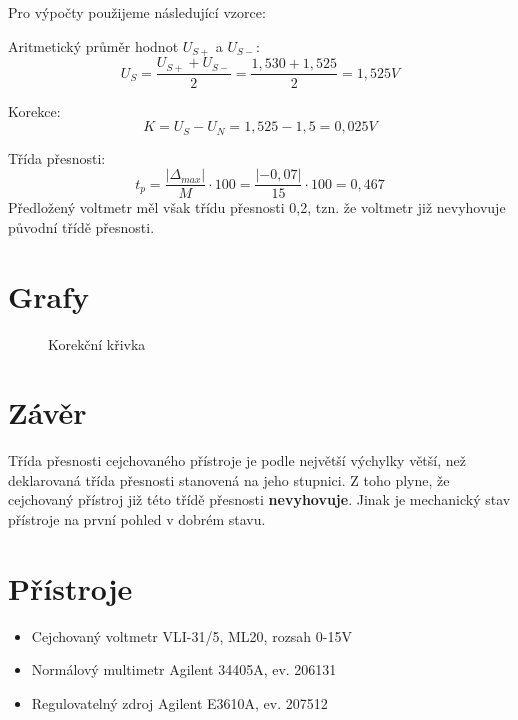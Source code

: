 \documentclass[12pt]{article} %
\begin{document}
Pro výpočty použijeme následující vzorce:

Aritmetický průměr hodnot $U_{S+}$ a $U_{S-}$:
\begin{equation}
U_S = \frac{U_{S+}+U_{S-}}{2} = \frac{1,530+1,525}{2} = 1,525V
\end{equation}

Korekce:
\begin{equation}
K = U_S - U_N = 1,525-1,5 = 0,025V
\end{equation}

Třída přesnosti:
\begin{equation}
t_p = \frac{|\Delta _{max}|}{M}\cdot 100 = \frac{|-0,07|}{15}\cdot 100=0,467
\end{equation}
Předložený voltmetr měl však třídu přesnosti 0,2, tzn. že voltmetr již nevyhovuje původní třídě přesnosti.

\section{Grafy}
\begin{figure}[H]
\centering
	\caption{Korekční křivka}
\end{figure}

\section{Závěr}
Třída přesnosti cejchovaného přístroje je podle největší výchylky větší, než deklarovaná třída přesnosti stanovená na jeho stupnici. Z toho plyne, že cejchovaný přístroj již této třídě přesnosti \textbf{nevyhovuje}. Jinak je mechanický stav přístroje na první pohled v dobrém stavu.

\section{Přístroje}
\begin{itemize}
\item Cejchovaný voltmetr VLI-31/5, ML20, rozsah 0-15V
\item Normálový multimetr Agilent 34405A, ev. 206131
\item Regulovatelný zdroj Agilent E3610A, ev. 207512
\end{itemize}
\end{document}
